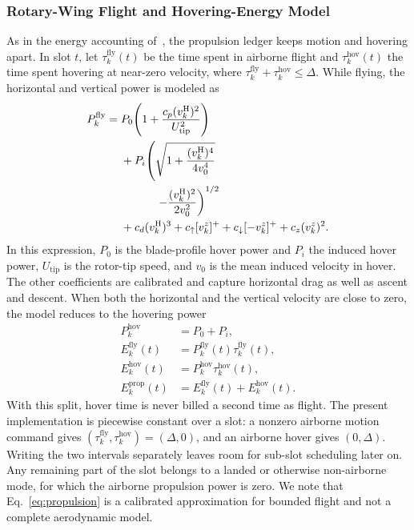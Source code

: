 \subsubsection{Rotary-Wing Flight and Hovering-Energy Model}
As in the energy accounting of~\cite{talukdar2026mappo}, the propulsion
ledger keeps motion and hovering apart. In slot $t$, let
$\tau_k^{\mathrm{fly}}(t)$ be the time spent in airborne flight and
$\tau_k^{\mathrm{hov}}(t)$ the time spent hovering at near-zero velocity,
where $\tau_k^{\mathrm{fly}}+\tau_k^{\mathrm{hov}}\le\Delta$. While flying,
the horizontal and vertical power is modeled as
\begin{equation}
\begin{aligned}
P_k^{\mathrm{fly}}={}&P_0\!\left(1+
\frac{c_p(v_k^{\mathrm H})^2}{U_{\mathrm{tip}}^2}\right)\\
&+P_i\!\left(\sqrt{1+\frac{(v_k^{\mathrm H})^4}{4v_0^4}}\right.\\
&\left.\hspace{3.1em}-\frac{(v_k^{\mathrm H})^2}{2v_0^2}\right)^{1/2}\\
&+c_d(v_k^{\mathrm H})^3
+c_{\uparrow}[v_k^z]^+
+c_{\downarrow}[-v_k^z]^+
+c_z(v_k^z)^2 .
\end{aligned}
\label{eq:propulsion}
\end{equation}
In this expression, $P_0$ is the blade-profile hover power and $P_i$ the
induced hover power, $U_{\mathrm{tip}}$ is the rotor-tip speed, and $v_0$ is
the mean induced velocity in hover. The other coefficients are calibrated and
capture horizontal drag as well as ascent and descent. When both the
horizontal and the vertical velocity are close to zero, the model reduces to
the hovering power
\begin{equation}
\begin{aligned}
P_k^{\mathrm{hov}}&=P_0+P_i,\\
E_k^{\mathrm{fly}}(t)&=P_k^{\mathrm{fly}}(t)
 \tau_k^{\mathrm{fly}}(t),\\
E_k^{\mathrm{hov}}(t)&=P_k^{\mathrm{hov}}
 \tau_k^{\mathrm{hov}}(t),\\
E_k^{\mathrm{prop}}(t)&=E_k^{\mathrm{fly}}(t)
 +E_k^{\mathrm{hov}}(t).
\end{aligned}
\label{eq:hovering}
\end{equation}
With this split, hover time is never billed a second time as flight. The present
implementation is piecewise constant over a slot: a nonzero airborne motion
command gives $(\tau_k^{\mathrm{fly}},\tau_k^{\mathrm{hov}})=(\Delta,0)$, and
an airborne hover gives $(0,\Delta)$. Writing the two intervals separately
leaves room for sub-slot scheduling later on. Any remaining part of the slot
belongs to a landed or otherwise non-airborne mode, for which the airborne
propulsion power is zero. We note that Eq.~\eqref{eq:propulsion} is a
calibrated approximation for bounded flight and not a complete aerodynamic
model.

